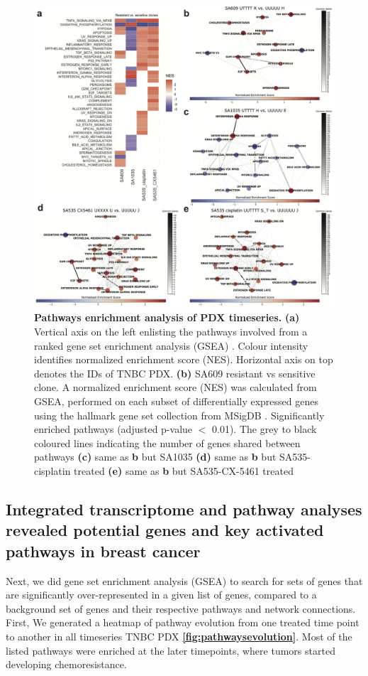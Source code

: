 \begin{figure}
\centering
  \includegraphics[width=\textwidth]{Figures/chap5/pathwaysnetwork.png}
\caption[Pathways enrichment analysis of PDX timeseries]
	{\small
	\textbf{Pathways enrichment analysis of PDX timeseries.}
	 	\textbf{(a)} Vertical axis on the left enlisting the pathways involved from a ranked gene set enrichment analysis (GSEA) \cite{shi2007gene}. Colour intensity identifies normalized enrichment score (NES). Horizontal axis on top denotes the IDs of TNBC PDX. \textbf{(b)} SA609 resistant vs sensitive clone.  A normalized enrichment score (NES) was calculated from GSEA, performed on each subset of differentially expressed genes using the hallmark gene set collection from MSigDB \cite{liberzon2015molecular}. Significantly enriched pathways (adjusted p-value $<$ 0.01). The grey to black coloured lines indicating the number of genes shared between pathways \textbf{(c)} same as \textbf{b} but SA1035 \textbf{(d)} same as \textbf{b} but SA535-cisplatin treated \textbf{(e)} same as \textbf{b} but SA535-CX-5461 treated
	}
	\label{fig:pathwaysnetwork}
\end{figure}

\subsection{Integrated transcriptome and pathway analyses revealed potential genes and key activated pathways in breast cancer}
Next, we did gene set enrichment analysis (GSEA) to search for sets of genes that are significantly over-represented in a given list of genes, compared to a background set of genes and their respective pathways and network connections. First, We generated a heatmap of pathway evolution from one treated time point to another in all timeseries TNBC PDX \textbf{\autoref{fig:pathwaysevolution}}. Most of the listed pathways were enriched at the later timepoints, where tumors started developing chemoresistance. 

